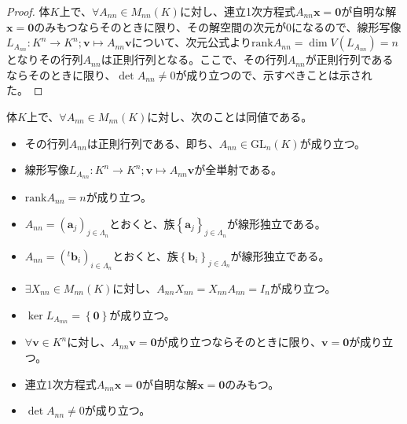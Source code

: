 \documentclass[dvipdfmx]{jsarticle}
\begin{document}
\begin{proof}
体$K$上で、$\forall A_{nn} \in M_{nn}(K)$に対し、連立1次方程式$A_{nn}\mathbf{x} = \mathbf{0}$が自明な解$\mathbf{x} = \mathbf{0}$のみもつならそのときに限り、その解空間の次元が$0$になるので、線形写像$L_{A_{nn}}:K^{n} \rightarrow K^{n};\mathbf{v} \mapsto A_{nn}\mathbf{v}$について、次元公式より${\mathrm{rank}}A_{nn} = \dim{V\left( L_{A_{nn}} \right)} = n$となりその行列$A_{nn}$は正則行列となる。ここで、その行列$A_{nn}$が正則行列であるならそのときに限り、$\det A_{nn} \neq 0$が成り立つので、示すべきことは示された。
\end{proof}
\begin{thm}\label{2.1.11.15}
体$K$上で、$\forall A_{nn} \in M_{nn}(K)$に対し、次のことは同値である。
\begin{itemize}
\item
  その行列$A_{nn}$は正則行列である、即ち、$A_{nn} \in \mathrm{GL}_{n}(K)$が成り立つ。
\item
  線形写像$L_{A_{nn}}:K^{n} \rightarrow K^{n};\mathbf{v} \mapsto A_{nn}\mathbf{v}$が全単射である。
\item
  ${\mathrm{rank}}A_{nn} = n$が成り立つ。
\item
  $A_{nn} = \left( \mathbf{a}_{j} \right)_{j \in \varLambda_{n}}$とおくと、族$\left\{ \mathbf{a}_j \right\}_{j \in \varLambda_{n} } $が線形独立である。
\item
  $A_{nn} = \left(^{t}\mathbf{b}_{i} \right)_{i \in \varLambda_{n}}$とおくと、族$\left\{ \mathbf{b}_i \right\}_{j \in \varLambda_{n} } $が線形独立である。
\item
  $\exists X_{nn} \in M_{nn}(K)$に対し、$A_{nn}X_{nn} = X_{nn}A_{nn} = I_{n}$が成り立つ。
\item
  $\ker L_{A_{mn}} = \left\{ \mathbf{0} \right\}$が成り立つ。
\item
  $\forall\mathbf{v} \in K^{n}$に対し、$A_{nn}\mathbf{v} = \mathbf{0}$が成り立つならそのときに限り、$\mathbf{v} = \mathbf{0}$が成り立つ。
\item
  連立1次方程式$A_{nn}\mathbf{x} = \mathbf{0}$が自明な解$\mathbf{x} = \mathbf{0}$のみもつ。
\item
  $\det A_{nn} \neq 0$が成り立つ。
\end{itemize}
\end{thm}
\end{document}
